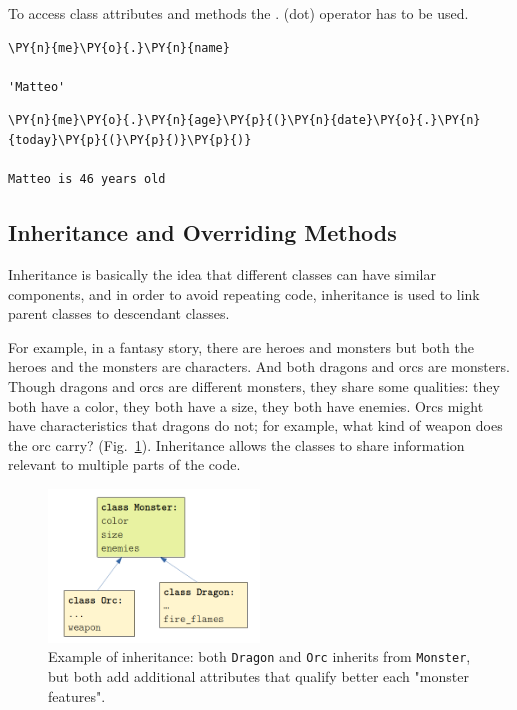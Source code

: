 To access class attributes and methods the $.$ (dot) operator has to be used.

\begin{tcolorbox}[breakable, size=fbox, boxrule=1pt, pad at break*=1mm,colback=cellbackground, colframe=cellborder]
\begin{Verbatim}[commandchars=\\\{\}]
\PY{n}{me}\PY{o}{.}\PY{n}{name}

'Matteo'
\end{Verbatim}
\end{tcolorbox}
        
\begin{tcolorbox}[breakable, size=fbox, boxrule=1pt, pad at break*=1mm,colback=cellbackground, colframe=cellborder]
\begin{Verbatim}[commandchars=\\\{\}]
\PY{n}{me}\PY{o}{.}\PY{n}{age}\PY{p}{(}\PY{n}{date}\PY{o}{.}\PY{n}{today}\PY{p}{(}\PY{p}{)}\PY{p}{)}

Matteo is 46 years old
\end{Verbatim}
\end{tcolorbox}

\subsection{Inheritance and Overriding Methods}\label{inheritance-and-overriding-methods}

Inheritance is basically the idea that different classes can have
similar components, and in order to avoid repeating code, inheritance is
used to link parent classes to descendant classes.

For example, in a fantasy story, there are heroes and monsters but both the heroes and the monsters are characters. And both dragons and orcs are monsters. Though dragons and orcs are different monsters, they share some qualities: they
both have a color, they both have a size, they both have enemies. Orcs
might have characteristics that dragons do not; for example, what kind
of weapon does the orc carry? (Fig.~\ref{fig:inheritance}). Inheritance allows the classes to share information relevant to multiple parts of the code.

\begin{figure}[h]
  \centering
  \includegraphics[width=0.5\textwidth]{figures/inheritance.png}
  \caption{Example of inheritance: both \texttt{Dragon} and \texttt{Orc} inherits from \texttt{Monster}, but both add additional attributes that qualify better each "monster features".}
  \label{fig:inheritance}
\end{figure}


